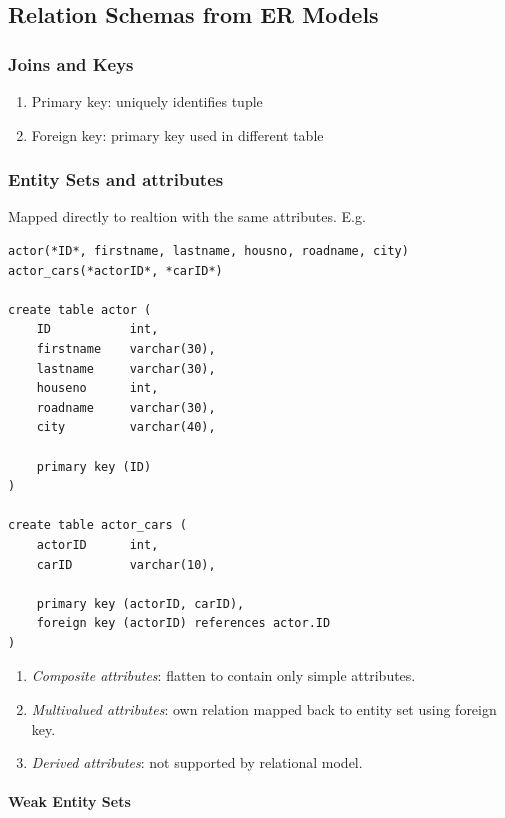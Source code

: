 \documentclass[twocolumn,english]{article}
\begin{document}
\subsection{Relation Schemas from ER Models}


\subsubsection{Joins and Keys}
\begin{enumerate}
\item Primary key: uniquely identifies tuple
\item Foreign key: primary key used in different table
\end{enumerate}

\subsubsection{Entity Sets and attributes}

Mapped directly to realtion with the same attributes. E.g.

\begin{lstlisting}
actor(*ID*, firstname, lastname, housno, roadname, city)
actor_cars(*actorID*, *carID*)

create table actor (
	ID           int,
	firstname    varchar(30),
	lastname     varchar(30),
	houseno      int,
	roadname     varchar(30),
	city         varchar(40),

	primary key (ID)
)

create table actor_cars (
	actorID      int,
	carID        varchar(10),
	
	primary key (actorID, carID),
	foreign key (actorID) references actor.ID
)
\end{lstlisting}

\begin{enumerate}
\item \emph{Composite attributes}: flatten to contain only simple attributes.
\item \emph{Multivalued attributes}: own relation mapped back to entity
set using foreign key.
\item \emph{Derived attributes}: not supported by relational model.
\end{enumerate}

\paragraph{Weak Entity Sets}
\end{document}
